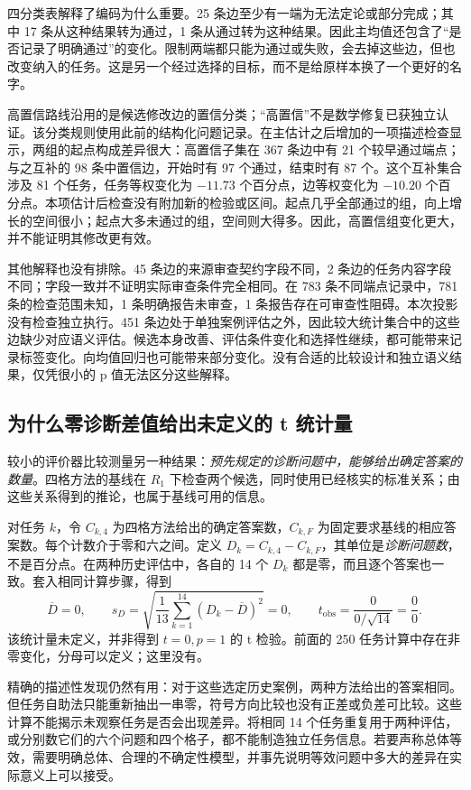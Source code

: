 四分类表解释了编码为什么重要。25 条边至少有一端为无法定论或部分完成；其中 17 条从这种结果转为通过，1 条从通过转为这种结果。因此主均值还包含了“是否记录了明确通过”的变化。限制两端都只能为通过或失败，会去掉这些边，但也改变纳入的任务。这是另一个经过选择的目标，而不是给原样本换了一个更好的名字。

高置信路线沿用的是候选修改边的置信分类；“高置信”不是数学修复已获独立认证。该分类规则使用此前的结构化问题记录。在主估计之后增加的一项描述检查显示，两组的起点构成差异很大：高置信子集在 367 条边中有 21 个较早通过端点；与之互补的 98 条中置信边，开始时有 97 个通过，结束时有 87 个。这个互补集合涉及 81 个任务，任务等权变化为 $-11.73$ 个百分点，边等权变化为 $-10.20$ 个百分点。本项估计后检查没有附加新的检验或区间。起点几乎全部通过的组，向上增长的空间很小；起点大多未通过的组，空间则大得多。因此，高置信组变化更大，并不能证明其修改更有效。

其他解释也没有排除。45 条边的来源审查契约字段不同，2 条边的任务内容字段不同；字段一致并不证明实际审查条件完全相同。在 783 条不同端点记录中，781 条的检查范围未知，1 条明确报告未审查，1 条报告存在可审查性阻碍。本次投影没有检查独立执行。451 条边处于单独案例评估之外，因此较大统计集合中的这些边缺少对应语义评估。候选本身改善、评估条件变化和选择性继续，都可能带来记录标签变化。向均值回归也可能带来部分变化。没有合适的比较设计和独立语义结果，仅凭很小的 p 值无法区分这些解释。

\subsection{为什么零诊断差值给出未定义的 t 统计量}
\label{subsec:zero-differences}
较小的评价器比较测量另一种结果：\emph{预先规定的诊断问题中，能够给出确定答案的数量}。四格方法的基线在 $R_1$ 下检查两个候选，同时使用已经核实的标准关系；由这些关系得到的推论，也属于基线可用的信息。

对任务 $k$，令 $C_{k,4}$ 为四格方法给出的确定答案数，$C_{k,F}$ 为固定要求基线的相应答案数。每个计数介于零和六之间。定义 $D_k=C_{k,4}-C_{k,F}$，其单位是\emph{诊断问题数}，不是百分点。在两种历史评估中，各自的 14 个 $D_k$ 都是零，而且逐个答案也一致。套入相同计算步骤，得到
\[
\overline D=0,\qquad
s_D=\sqrt{\frac{1}{13}\sum_{k=1}^{14}(D_k-\overline D)^2}=0,
\qquad t_{\mathrm{obs}}=\frac{0}{0/\sqrt{14}}=\frac{0}{0}.
\]
该统计量未定义，并非得到 $t=0,p=1$ 的 t 检验。前面的 250 任务计算中存在非零变化，分母可以定义；这里没有。

精确的描述性发现仍然有用：对于这些选定历史案例，两种方法给出的答案相同。但任务自助法只能重新抽出一串零，符号方向比较也没有正差或负差可比较。这些计算不能揭示未观察任务是否会出现差异。将相同 14 个任务重复用于两种评估，或分别数它们的六个问题和四个格子，都不能制造独立任务信息。若要声称总体等效，需要明确总体、合理的不确定性模型，并事先说明等效问题中多大的差异在实际意义上可以接受。

